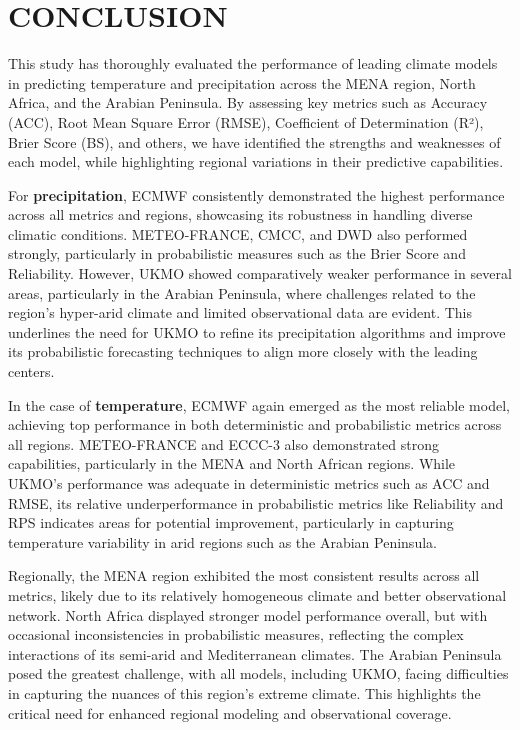 \chapter{CONCLUSION}
This study has thoroughly evaluated the performance of leading climate models in predicting temperature and precipitation across the MENA region, North Africa, and the Arabian Peninsula. By assessing key metrics such as Accuracy (ACC), Root Mean Square Error (RMSE), Coefficient of Determination (R²), Brier Score (BS), and others, we have identified the strengths and weaknesses of each model, while highlighting regional variations in their predictive capabilities.

For \textbf{precipitation}, ECMWF consistently demonstrated the highest performance across all metrics and regions, showcasing its robustness in handling diverse climatic conditions. METEO-FRANCE, CMCC, and DWD also performed strongly, particularly in probabilistic measures such as the Brier Score and Reliability. However, UKMO showed comparatively weaker performance in several areas, particularly in the Arabian Peninsula, where challenges related to the region's hyper-arid climate and limited observational data are evident. This underlines the need for UKMO to refine its precipitation algorithms and improve its probabilistic forecasting techniques to align more closely with the leading centers.

In the case of \textbf{temperature}, ECMWF again emerged as the most reliable model, achieving top performance in both deterministic and probabilistic metrics across all regions. METEO-FRANCE and ECCC-3 also demonstrated strong capabilities, particularly in the MENA and North African regions. While UKMO's performance was adequate in deterministic metrics such as ACC and RMSE, its relative underperformance in probabilistic metrics like Reliability and RPS indicates areas for potential improvement, particularly in capturing temperature variability in arid regions such as the Arabian Peninsula.

Regionally, the MENA region exhibited the most consistent results across all metrics, likely due to its relatively homogeneous climate and better observational network. North Africa displayed stronger model performance overall, but with occasional inconsistencies in probabilistic measures, reflecting the complex interactions of its semi-arid and Mediterranean climates. The Arabian Peninsula posed the greatest challenge, with all models, including UKMO, facing difficulties in capturing the nuances of this region's extreme climate. This highlights the critical need for enhanced regional modeling and observational coverage.

